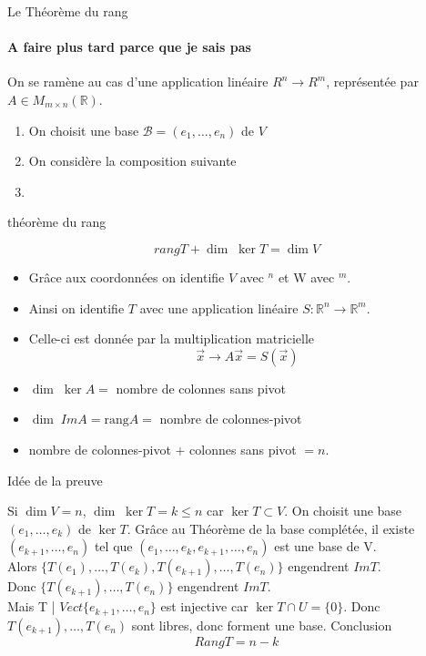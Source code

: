 \begin{parag}{Le Théorème du rang}
    



\paragraph{A faire plus tard parce que je sais pas}
    On se ramène au cas d'une application linéaire $R^n \to R^m$, représentée par $A \in M_{m\times n}\left(\mathbb{R} \right)$.
    \begin{enumerate}
        \item On choisit une base $\mathcal{B} = \left(e_1, \dots, e_n\right)$ de $V$
        \item On considère la composition suivante
 \item     \end{enumerate}


\begin{theoreme}{théorème du rang}
    
        \[rangT + \dim\; \ker T  = \dim V\]
    
\end{theoreme}
\begin{itemize}
    \item Grâce aux coordonnées on identifie $V$ avec \R$^n$ et W avec \R$^m$.
    \item Ainsi on identifie $T$ avec une application linéaire $S: \mathbb{R}^n \to \mathbb{R}^m$.
    \item Celle-ci est donnée par la multiplication matricielle \[\vec{x} \to A\vec{x} = S\left(\vec{x}\right)\]
    \item $\dim \; \ker A = $ nombre de colonnes sans pivot
    \item $\dim \; ImA = \text{rang}A = $ nombre de colonnes-pivot
    \item  nombre de colonnes-pivot $+$ colonnes sans pivot $= n$.
\end{itemize}

\begin{subparag}{Idée de la preuve}
    

Si $\dim V = n$, $\dim \; \ker T = k \leq n$ car $\ker T \subset V$. On choisit une base $\left(e_1, \dots, e_k\right)$ de $\ker T$. Grâce au Théorème de la base complétée, il existe $\left(e_{k+1}, \dots, e_n\right)$  tel que $\left(e_1, \dots, e_k, e_{k+1}, \dots, e_n\right) $ est une base de V. 
\\
Alors $\{T\left(e_1\right), \dots, T\left(e_k\right), T\left(e_{k+1}\right), \dots, T\left(e_n\right)\}$ engendrent $ImT$.
\\
Donc $\{T\left(e_{k+1}\right), \dots, T\left(e_n\right)\}$ engendrent $ImT$.
\\
Mais T | $Vect\{e_{k+1}, \dots, e_n\}$ est injective car $\ker T \cap U = \{0\}$.
Donc $T\left(e_{k+1}\right), \dots, T\left(e_n\right)$ sont libres, donc forment une base. Conclusion \[RangT  = n - k\]
\end{subparag}



\end{parag}

